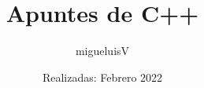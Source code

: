 \documentclass[12pt]{article}
\title{Apuntes de C++}
\author{migueluisV}
\date{Realizadas: Febrero 2022}
\begin{document}
\renewcommand*\contentsname{Índice}

\maketitle\newpage
\tableofcontents\newpage
\listoftables\newpage








\end{document}
